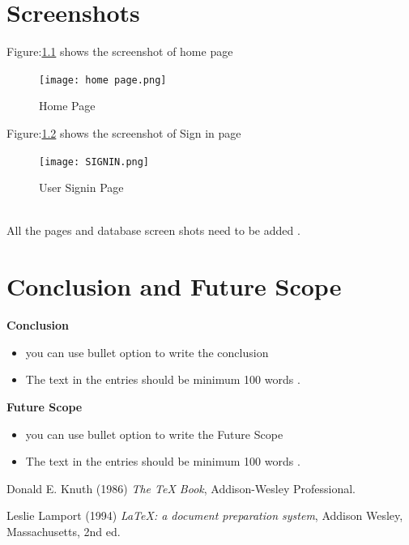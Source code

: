 \documentclass[12pt, letter paper]{report}
\begin{document}
\chapter{Screenshots}

Figure:\ref{fig:home page.png} shows the screenshot of home page 
\begin{figure}[h]
 \centering
 \texttt{[image: home page.png]}
 \caption{Home Page}
 \label{fig:home page.png}
\end{figure}

Figure:\ref{fig:SIGNIN.png} shows the screenshot of Sign in  page 
\begin{figure}[h]
 \centering
 \texttt{[image: SIGNIN.png]}
 \caption{User Signin Page}
 \label{fig:SIGNIN.png}
\end{figure}
\\All the pages and database screen shots need to be added .
\chapter{Conclusion and Future Scope}

\textbf{Conclusion} 
\begin{itemize}
 \item {you can use bullet option to write the conclusion}
 \item {The text in the entries should be minimum 100 words }.
\end{itemize}
\textbf{Future Scope} 
\begin{itemize}
 \item {you can use bullet option to write the Future Scope}
 \item {The text in the entries should be minimum 100 words }.
\end{itemize}

\begin{thebibliography}{7}
Donald E. Knuth (1986) \emph{The \TeX{} Book}, Addison-Wesley Professional.

Leslie Lamport (1994) \emph{\LaTeX: a document preparation system}, Addison
Wesley, Massachusetts, 2nd ed.
\end{thebibliography}
\end{document}
